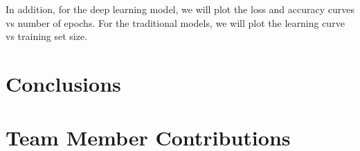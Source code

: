 \documentclass{sig-alternate-05-2015}
\begin{document}

In addition, for the deep learning model, we will plot the loss and accuracy curves vs number of epochs. For the traditional models, we will plot the learning curve vs training set size.

\section{Conclusions}

\section{Team Member Contributions}


%

%
\end{document}
